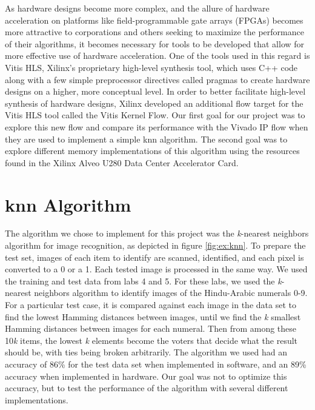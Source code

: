 \documentclass[11pt, final, conference, letterpaper, twocolumn]{IEEEtran}[2015/08/26]
\begin{document}
As hardware designs become more complex, and the allure of hardware acceleration on platforms like field-programmable gate arrays (FPGAs) becomes more attractive to corporations and others seeking to maximize the performance of their algorithms, it becomes necessary for tools to be developed that allow for more effective use of hardware acceleration. One of the tools used in this regard is Vitis HLS, Xilinx's proprietary high-level synthesis tool, which uses C++ code along with a few simple preprocessor directives called pragmas to create hardware designs on a higher, more conceptual level. In order to better facilitate high-level synthesis of hardware designs, Xilinx developed an additional flow target for the Vitis HLS tool called the Vitis Kernel Flow.
Our first goal for our project was to explore this new flow and compare its performance with the Vivado IP flow when they are used to implement a simple knn algorithm.
The second goal was to explore different memory implementations of this algorithm using the resources found in the Xilinx Alveo U280 Data Center Accelerator Card.

\section{knn Algorithm}
\label{sec:knn-algorithm}

The algorithm we chose to implement for this project was the \textit{k}-nearest neighbors algorithm for image recognition, as depicted in figure \ref{fig:ex:knn}. To prepare the test set, images of each item to identify are scanned, identified, and each pixel is converted to a 0 or a 1. Each tested image is processed in the same way. We used the training and test data from labs 4 and 5. For these labs, we used the \textit{k}-nearest neighbors algorithm to identify images of the Hindu-Arabic numerals 0-9. For a particular test case, it is compared against each image in the data set to find the lowest Hamming distances between images, until we find the \textit{k} smallest Hamming distances between images for each numeral. Then from among these 10\textit{k} items, the lowest \textit{k} elements become the voters that decide what the result should be, with ties being broken arbitrarily. The algorithm we used had an accuracy of 86\% for the test data set when implemented in software, and an 89\% accuracy when implemented in hardware. Our goal was not to optimize this accuracy, but to test the performance of the algorithm with several different implementations.
\end{document}
